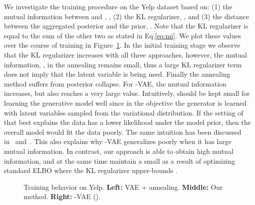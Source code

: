 \documentclass{article} \usepackage{iclr2019_conference,times}
\begin{document}
We investigate the training procedure on the Yelp dataset based on: (1) the mutual information between  and , , (2) the KL regularizer, , and (3) the distance between the aggregated posterior and the prior, . Note that the KL regularizer is equal to the sum of the other two as stated in Eq.\ref{eq:mi}. We plot these values over the course of training in Figure~\ref{fig:mi-comp}. In the initial training stage we observe that the KL regularizer increases with all three approaches, however, the mutual information, , in the annealing remains small, thus a large KL regularizer term does not imply that the latent variable is being used. Finally the annealing method suffers from posterior collapse. For -VAE, the mutual information increases, but  also reaches a very large value. Intuitively,  should be kept small for learning the generative model well since in the objective the generator  is learned with latent variables sampled from the variational distribution. If the setting of  that best explains the data has a lower likelihood under the model prior, then the overall model would fit the data poorly.  The same intuition has been discussed in~\citet{zhao2017infovae} and~\citet{tolstikhin2017wasserstein}. This also explains why -VAE generalizes poorly when it has large mutual information. In contrast, our approach is able to obtain high mutual information, and at the same time maintain a small  as a result of optimizing standard ELBO where the KL regularizer upper-bounds .



\begin{figure}[!t]
\centering
    \hfill
    \hfill
    \vspace{-12pt}
\caption{Training behavior on Yelp. \textbf{Left: }VAE + annealing. \textbf{Middle: }Our method. \textbf{Right: }-VAE ().\label{fig:mi-comp}}
\vspace{-3mm}
\end{figure}
\end{document}

